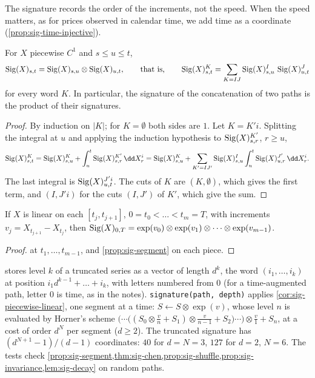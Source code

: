 The signature records the order of the increments, not the speed. When the speed matters, as for
prices observed in calendar time, we add time as a coordinate (\cref{prop:sig-time-injective}).

\begin{theorem}\label{thm:sig-chen}
For $X$ piecewise $C^1$ and $s\le u\le t$,
\[
  \operatorname{Sig}(X)_{s,t}=\operatorname{Sig}(X)_{s,u}\otimes\operatorname{Sig}(X)_{u,t},\qquad\text{that is,}\qquad
  \operatorname{Sig}(X)^K_{s,t}=\sum_{K=IJ}\operatorname{Sig}(X)^I_{s,u}\,\operatorname{Sig}(X)^J_{u,t}
\]
for every word $K$.
In particular, the signature of the concatenation of two paths is the product of their signatures.
\end{theorem}

\begin{proof}
By induction on $|K|$; for $K=\emptyset$ both sides are $1$. Let $K=K'i$. Splitting the integral at $u$
and applying the induction hypothesis to $\operatorname{Sig}(X)^{K'}_{s,r}$, $r\ge u$,
\[
  \sigSig(X)^K_{s,t}=\sigSig(X)^K_{s,u}+\int_u^t\sigSig(X)^{K'}_{s,r}\,\dd X^i_r
  =\sigSig(X)^K_{s,u}+\sum_{K'=IJ'}\sigSig(X)^I_{s,u}\int_u^t\sigSig(X)^{J'}_{u,r}\,\dd X^i_r .
\]
The last integral is $\operatorname{Sig}(X)^{J'i}_{u,t}$. The cuts of $K$ are $(K,\emptyset)$, which gives the first term,
and $(I,J'i)$ for the cuts $(I,J')$ of $K'$, which give the sum.
\end{proof}

\begin{corollary}\label{cor:sig-piecewise-linear}
If $X$ is linear on each $[t_j,t_{j+1}]$, $0=t_0<\dots<t_m=T$, with increments $v_j=X_{t_{j+1}}-X_{t_j}$, then
$\operatorname{Sig}(X)_{0,T}=\exp(v_0)\otimes\exp(v_1)\otimes\dots\otimes\exp(v_{m-1})$.
\end{corollary}

\begin{proof}
 at $t_1,\dots,t_{m-1}$, and \cref{prop:sig-segment} on each piece.
\end{proof}

\begin{incode}
 stores level $k$ of a truncated series as a vector of length
$d^k$, the word $(i_1,\dots,i_k)$ at position $i_1d^{k-1}+\dots+i_k$, with letters numbered from $0$ (for a
time-augmented path, letter $0$ is time, as in the notes). \texttt{signature(path, depth)} applies
\cref{cor:sig-piecewise-linear}, one segment at a time: $S\leftarrow S\otimes\exp(v)$, whose level $n$ is
evaluated by Horner's scheme
$\big(\cdots\big((S_0\otimes\tfrac vn+S_1)\otimes\tfrac v{n-1}+S_2\big)\cdots\big)\otimes\tfrac v1+S_n$, at a
cost of order $d^N$ per segment ($d\ge2$). The truncated signature has $(d^{N+1}-1)/(d-1)$ coordinates: $40$ for
$d=N=3$, $127$ for $d=2$, $N=6$. The tests check \cref{prop:sig-segment,thm:sig-chen,prop:sig-shuffle,prop:sig-invariance,lem:sig-decay}
on random paths.
\end{incode}

